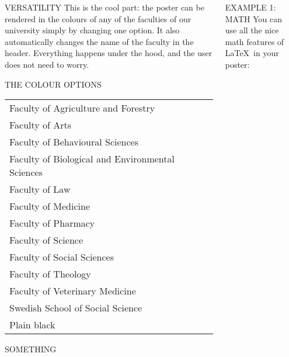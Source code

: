 \documentclass[final]{beamer}
\begin{document}
\begin{frame}[t, fragile]
\begin{columns}[T]
\begin{column}{0.32\linewidth}
\end{column}

\begin{column}{0.32\linewidth}

\begin{block}{VERSATILITY}
This is the cool part: the poster can be rendered in the colours of any of the faculties of our university simply by changing one option. It also automatically changes the name of the faculty in the header. Everything happens under the hood, and the user does not need to worry.

\end{block}

\begin{block}{THE COLOUR OPTIONS}

\begin{center}
\begin{tabular}{l}
Faculty of Agriculture and Forestry \\
Faculty of Arts \\
Faculty of Behavioural Sciences \\
Faculty of Biological and Environmental Sciences \\
Faculty of Law \\
Faculty of Medicine \\
Faculty of Pharmacy \\
Faculty of Science \\
Faculty of Social Sciences \\
Faculty of Theology \\
Faculty of Veterinary Medicine \\
Swedish School of Social Science \\
Plain black
\end{tabular}
\end{center}

\end{block}

\begin{block}{SOMETHING}
\end{block}


\end{column}

\begin{column}{0.32\linewidth}

\begin{block}{EXAMPLE 1: MATH}
	You can use all the nice math features of \LaTeX~in your poster:


\end{block}
\end{column}
\end{columns}
\end{frame}
\end{document}
